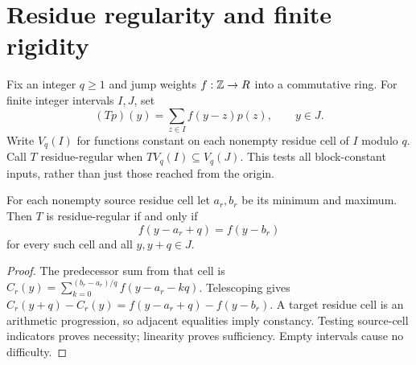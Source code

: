 \section{Residue regularity and finite rigidity}
Fix an integer $q\ge1$ and jump weights $f:\mathbb Z\to R$ into a commutative ring. For finite integer intervals $I,J$, set
\[
(Tp)(y)=\sum_{z\in I}f(y-z)p(z),\qquad y\in J.
\]
Write $V_q(I)$ for functions constant on each nonempty residue cell of $I$ modulo $q$. Call $T$ residue-regular when $T V_q(I)\subseteq V_q(J)$. This tests all block-constant inputs, rather than just those reached from the origin.

\begin{proposition}\label{prop:boundary}
For each nonempty source residue cell let $a_r,b_r$ be its minimum and maximum. Then $T$ is residue-regular if and only if
\begin{equation}\label{eq:boundary}
f(y-a_r+q)=f(y-b_r)
\end{equation}
for every such cell and all $y,y+q\in J$.
\end{proposition}
\begin{proof}
The predecessor sum from that cell is
$C_r(y)=\sum_{k=0}^{(b_r-a_r)/q}f(y-a_r-kq)$.
Telescoping gives $C_r(y+q)-C_r(y)=f(y-a_r+q)-f(y-b_r)$.
A target residue cell is an arithmetic progression, so adjacent equalities imply constancy. Testing source-cell indicators proves necessity; linearity proves sufficiency. Empty intervals cause no difficulty.
\end{proof}

